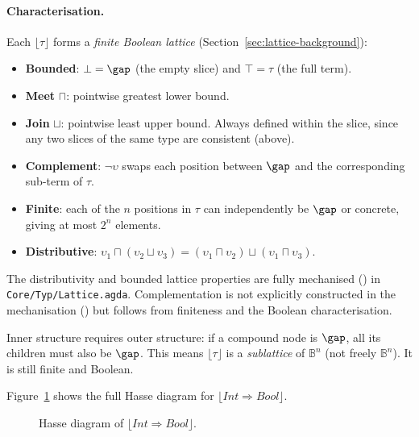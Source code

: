 \paragraph{Characterisation.} Each $\lfloor\tau\rfloor$ forms a \textit{finite Boolean lattice} (Section~\ref{sec:lattice-background}):
\begin{itemize}
\item \textbf{Bounded}: $\bot = \gap$ (the empty slice) and $\top = \tau$ (the full term).
\item \textbf{Meet} $\sqcap$: pointwise greatest lower bound.
\item \textbf{Join} $\sqcup$: pointwise least upper bound. Always defined within the slice, since any two slices of the same type are consistent (above).
\item \textbf{Complement}: $\neg\upsilon$ swaps each position between $\gap$ and the corresponding sub-term of $\tau$.
\item \textbf{Finite}: each of the $n$ positions in $\tau$ can independently be $\gap$ or concrete, giving at most $2^n$ elements.
\item \textbf{Distributive}: $\upsilon_1 \sqcap (\upsilon_2 \sqcup \upsilon_3) = (\upsilon_1 \sqcap \upsilon_2) \sqcup (\upsilon_1 \sqcap \upsilon_3)$.
\end{itemize}

The distributivity and bounded lattice properties are fully mechanised (\yo) in \texttt{Core/Typ/Lattice.agda}. Complementation is not explicitly constructed in the mechanisation (\no) but follows from finiteness and the Boolean characterisation.

\begin{remark}
Inner structure requires outer structure: if a compound node is $\gap$, all its children must also be $\gap$. This means $\lfloor\tau\rfloor$ is a \textit{sublattice} of $\mathbb{B}^n$ (not freely $\mathbb{B}^n$). It is still finite and Boolean.
\end{remark}

Figure~\ref{fig:hasse-int-arrow-bool} shows the full Hasse diagram for $\lfloor\mathit{Int} \Rightarrow \mathit{Bool}\rfloor$.

\begin{figure}[t]
\centering
{}
\caption{Hasse diagram of $\lfloor\mathit{Int} \Rightarrow \mathit{Bool}\rfloor$.}
\label{fig:hasse-int-arrow-bool}
\end{figure}

